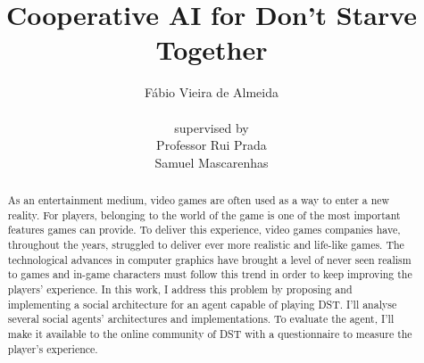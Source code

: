 \documentclass[runningheads, a4paper]{llncs}
\begin{document}
\title{Cooperative AI for Don't Starve Together}
\author{Fábio Vieira de Almeida\\  \\ supervised by\\ Professor Rui Prada\\ Samuel Mascarenhas}

\maketitle

\begin{abstract}
As an entertainment medium, video games are often used as a way to enter a new reality.
For players, belonging to the world of the game is one of the most important features games can provide.
To deliver this experience, video games companies have, throughout the years, struggled to deliver ever more realistic and life-like games.
The technological advances in computer graphics have brought a level of never seen realism to games and in-game characters must follow this trend in order to keep improving the players' experience.
In this work, I address this problem by proposing and implementing a social architecture for an agent capable of playing \ac{DST}.
I'll analyse several social agents' architectures and implementations.
To evaluate the agent, I'll make it available to the online community of \ac{DST} with a questionnaire to measure the player's experience.
\end{abstract}

\tableofcontents
\newpage





\newpage

\printbibliography
\newpage

%
\end{document}
